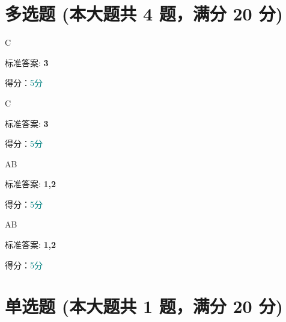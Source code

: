 \documentclass[12pt, a4paper, addpoints, answers]{exam}
\begin{document}
\hspace{5cm}

\section{\normalsize{多选题 (本大题共 4 题，满分 20 分)}}
\hspace{1.5cm}

\begin{questions}
\question[5] C

\begin{oneparcheckboxes}
\end{oneparcheckboxes}

标准答案: \textbf{3}

得分：\textcolor{teal}{5分}

\question[5] C

\begin{oneparcheckboxes}
\end{oneparcheckboxes}

标准答案: \textbf{3}

得分：\textcolor{teal}{5分}

\question[5] AB

\begin{oneparcheckboxes}
\end{oneparcheckboxes}

标准答案: \textbf{1,2}

得分：\textcolor{teal}{5分}

\question[5] AB

\begin{oneparcheckboxes}
\end{oneparcheckboxes}

标准答案: \textbf{1,2}

得分：\textcolor{teal}{5分}

\end{questions}

\hspace{5cm}

\section{\normalsize{单选题 (本大题共 1 题，满分 20 分)}}
\hspace{1.5cm}
\end{document}
